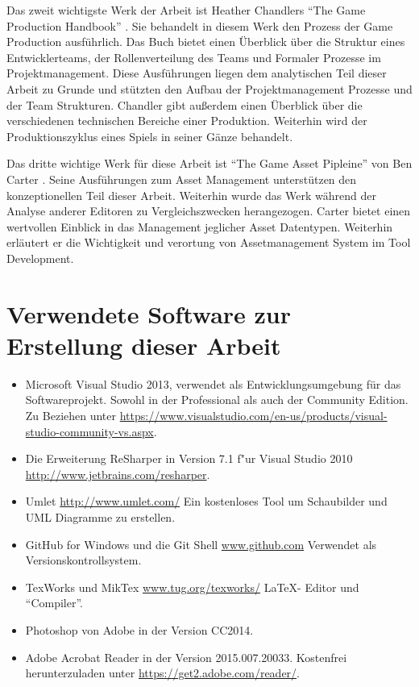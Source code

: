\documentclass[pagesize, paper=a4, fontsize=12pt, titlepage=true, headings=small, headnosepline, abstractoff, liststotoc, nochapterprefix, plainheadsepline, twoside]{scrreprt}
\begin{document}
Das zweit wichtigste Werk der Arbeit ist Heather Chandlers “The Game Production Handbook” \parencite{Chandler2006}. Sie behandelt in diesem Werk den Prozess der Game Production ausführlich. Das Buch bietet einen Überblick über die Struktur eines Entwicklerteams, der Rollenverteilung des Teams und Formaler Prozesse im Projektmanagement. Diese Ausführungen liegen dem analytischen Teil dieser Arbeit zu Grunde und stützten den Aufbau der Projektmanagement Prozesse und der Team Strukturen. Chandler gibt außerdem einen Überblick über die verschiedenen technischen Bereiche einer Produktion. Weiterhin wird der Produktionszyklus eines Spiels in seiner Gänze behandelt.

Das dritte wichtige Werk für diese Arbeit ist “The Game Asset Pipleine” von Ben Carter \parencite{Carter2004}. Seine Ausführungen zum Asset Management unterstützen den konzeptionellen Teil dieser Arbeit. Weiterhin wurde das Werk während der Analyse anderer Editoren zu Vergleichszwecken herangezogen. Carter bietet einen wertvollen Einblick in das Management jeglicher Asset Datentypen. Weiterhin erläutert er die Wichtigkeit und verortung von Assetmanagement System im Tool Development.

\section{Verwendete Software zur Erstellung dieser Arbeit}
\begin{itemize}
\item Microsoft Visual Studio 2013, \newline verwendet als Entwicklungsumgebung für das Softwareprojekt. Sowohl in der Professional als auch der Community Edition. Zu Beziehen unter  \url{https://www.visualstudio.com/en-us/products/visual-studio-community-vs.aspx}.
\item Die Erweiterung ReSharper in Version 7.1 f"ur Visual Studio 2010 \url{http://www.jetbrains.com/resharper}.
\item Umlet \url{http://www.umlet.com/} \newline Ein kostenloses Tool um Schaubilder und UML Diagramme zu erstellen.
\item GitHub for Windows und die Git Shell \url{www.github.com} \newline Verwendet als Versionskontrollsystem.
\item TexWorks und MikTex \url{www.tug.org/texworks/} \newline \LaTeX- Editor und “Compiler”.
\item Photoshop von Adobe in der Version CC2014.
\item Adobe Acrobat Reader in der Version 2015.007.20033. Kostenfrei herunterzuladen unter \url{https://get2.adobe.com/reader/}.
\end{itemize}
\end{document}
